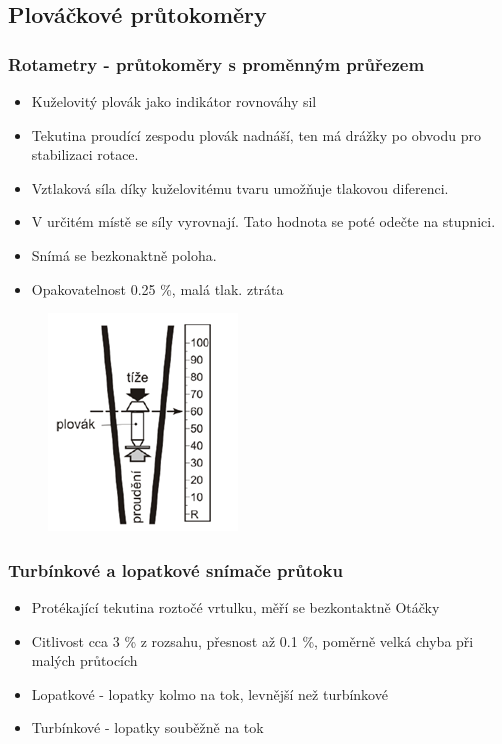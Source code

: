 \subsection*{Plováčkové průtokoměry}

\subsubsection*{Rotametry - průtokoměry s proměnným průřezem}
\begin{itemize}
    \item Kuželovitý plovák jako indikátor rovnováhy sil
    \item Tekutina proudící zespodu plovák nadnáší, ten má drážky po obvodu pro stabilizaci rotace.
    \item Vztlaková síla díky kuželovitému tvaru umožňuje tlakovou diferenci.
    \item V určitém místě se síly vyrovnají. Tato hodnota se poté odečte na stupnici. 
    \item Snímá se bezkonaktně poloha.
    \item Opakovatelnost 0.25 \%, malá tlak. ztráta
\end{itemize}

\begin{figure}[h]
    \centering
    \includegraphics[scale = 1]{img/rotatometr.png}
\end{figure}

\subsubsection*{Turbínkové a lopatkové snímače průtoku}
\begin{itemize}
    \item Protékající tekutina roztočé vrtulku, měří se bezkontaktně Otáčky
    \item Citlivost cca 3 \% z rozsahu, přesnost až 0.1 \%, poměrně velká chyba při malých průtocích
    \item Lopatkové - lopatky kolmo na tok, levnější než turbínkové
    \item Turbínkové - lopatky souběžně na tok
\end{itemize}

